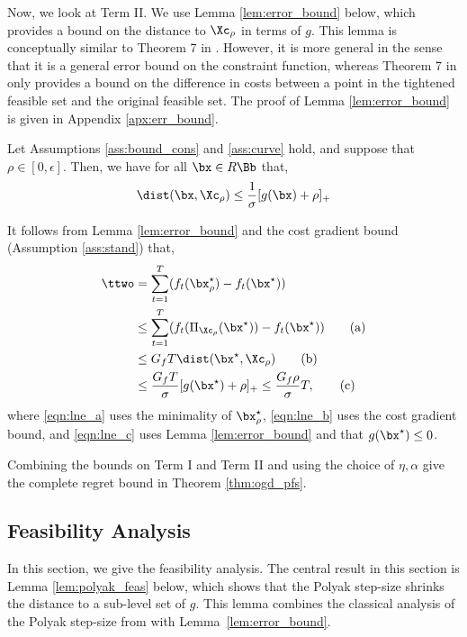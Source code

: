 Now, we look at Term II.
We use Lemma \ref{lem:error_bound} below, which provides a bound on the distance to $\Xc_\rho$ in terms of $g$.
This lemma is conceptually similar to Theorem 7 in \citet{mahdavi2012trading}.
However, it is more general in the sense that it is a general error bound on the constraint function, whereas Theorem 7 in \citet{mahdavi2012trading} only provides a bound on the difference in costs between a point in the tightened feasible set and the original feasible set. 
The proof of Lemma \ref{lem:error_bound} is given in Appendix \ref{apx:err_bound}.

\begin{lemma}
    \label{lem:error_bound}
    Let Assumptions \ref{ass:bound_cons} and \ref{ass:curve} hold, and suppose that $\rho \in [0,\epsilon]$.
    Then, we have for all $\bx \in R \Bb$ that,
    \begin{equation}
        \label{eqn:error_bound}
        \dist(\bx, \Xc_\rho) \leq \frac{1}{\sigma} [g(\bx) + \rho]_+
    \end{equation}
\end{lemma}

It follows from Lemma \ref{lem:error_bound} and the cost gradient bound (Assumption \ref{ass:stand}) that,
\begin{align*}
    \ttwo & = \sum_{t=1}^{T} (f_t(\bx_\rho^\star) - f_t(\bx^\star)) \\
    & \leq \sum_{t=1}^{T} (f_t(\Pi_{\Xc_\rho}(\bx^\star)) - f_t(\bx^\star)) \tag{a} \label{eqn:lne_a}\\
    & \leq G_f T \dist(\bx^\star, \Xc_\rho)  \tag{b} \label{eqn:lne_b}\\
    & \leq \frac{G_f T}{\sigma} [g(\bx^\star) + \rho]_+ \leq \frac{G_f \rho}{\sigma} T, \tag{c} \label{eqn:lne_c}
\end{align*}
where \eqref{eqn:lne_a} uses the minimality of $\bx_\rho^\star$, \eqref{eqn:lne_b} uses the cost gradient bound, and \eqref{eqn:lne_c} uses Lemma \ref{lem:error_bound} and that $g(\bx^\star) \leq 0$.

Combining the bounds on Term I and Term II and using the choice of $\eta, \alpha$ give the complete regret bound in Theorem \ref{thm:ogd_pfs}.

\subsection{Feasibility Analysis}
\label{sec:feas_anal}

In this section, we give the feasibility analysis.
The central result in this section is Lemma \ref{lem:polyak_feas} below, which shows that the Polyak step-size shrinks the distance to a sub-level set of $g$.
This lemma combines the classical analysis of the Polyak step-size from \citet{polyak1969minimization} with Lemma~\ref{lem:error_bound}.

